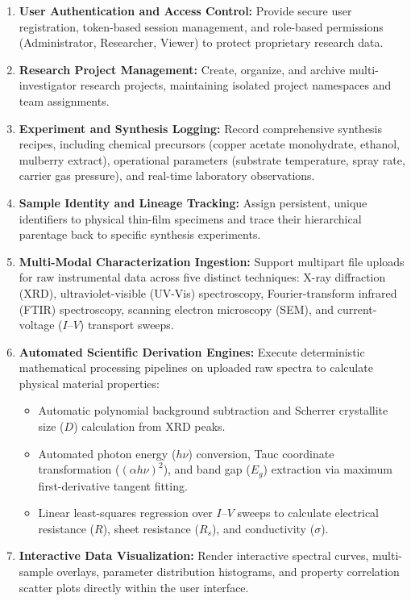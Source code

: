 \documentclass[12pt,a4paper,oneside]{report}
\begin{document}
{{{\begin{enumerate}
    \item \textbf{User Authentication and Access Control:} Provide secure user registration, token-based session management, and role-based permissions (Administrator, Researcher, Viewer) to protect proprietary research data.
    \item \textbf{Research Project Management:} Create, organize, and archive multi-investigator research projects, maintaining isolated project namespaces and team assignments.
    \item \textbf{Experiment and Synthesis Logging:} Record comprehensive synthesis recipes, including chemical precursors (copper acetate monohydrate, ethanol, mulberry extract), operational parameters (substrate temperature, spray rate, carrier gas pressure), and real-time laboratory observations.
    \item \textbf{Sample Identity and Lineage Tracking:} Assign persistent, unique identifiers to physical thin-film specimens and trace their hierarchical parentage back to specific synthesis experiments.
    \item \textbf{Multi-Modal Characterization Ingestion:} Support multipart file uploads for raw instrumental data across five distinct techniques: X-ray diffraction (XRD), ultraviolet-visible (UV-Vis) spectroscopy, Fourier-transform infrared (FTIR) spectroscopy, scanning electron microscopy (SEM), and current-voltage ($I\text{--}V$) transport sweeps.
    \item \textbf{Automated Scientific Derivation Engines:} Execute deterministic mathematical processing pipelines on uploaded raw spectra to calculate physical material properties:
    \begin{itemize}
        \item Automatic polynomial background subtraction and Scherrer crystallite size ($D$) calculation from XRD peaks.
        \item Automated photon energy ($h\nu$) conversion, Tauc coordinate transformation ($(\alpha h\nu)^2$), and band gap ($E_g$) extraction via maximum first-derivative tangent fitting.
        \item Linear least-squares regression over $I\text{--}V$ sweeps to calculate electrical resistance ($R$), sheet resistance ($R_s$), and conductivity ($\sigma$).
    \end{itemize}
    \item \textbf{Interactive Data Visualization:} Render interactive spectral curves, multi-sample overlays, parameter distribution histograms, and property correlation scatter plots directly within the user interface.

\end{enumerate}}}}
\end{document}
